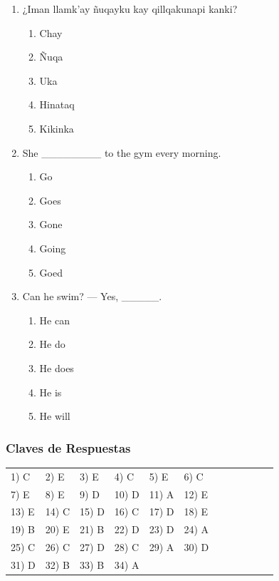\begin{enumerate}
	\item ¿Iman llamk’ay ñuqayku kay qillqakunapi kanki?
	\begin{enumerate}[label=\alph*)]
		\item Chay
		\item Ñuqa
		\item Uka
		\item Hinataq
		\item Kikinka
	\end{enumerate}
	

	
	\item She \_\_\_\_\_\_\_\_ to the gym every morning.
	\begin{enumerate}[label=\alph*)]
		\item Go
		\item Goes
		\item Gone
		\item Going
		\item Goed
	\end{enumerate}
	
	\item Can he swim? --- Yes, \_\_\_\_\_.
	\begin{enumerate}[label=\alph*)]
		\item He can
		\item He do
		\item He does
		\item He is
		\item He will
	\end{enumerate}
	
\end{enumerate}





\subsubsection*{Claves de Respuestas}

\begin{center}
	\begin{tabular}{ll ll ll ll ll ll}
		1) C & 2) E & 3) E & 4) C & 5) E & 6) C \\
		7) E & 8) E & 9) D & 10) D & 11) A & 12) E \\
		13) E & 14) C & 15) D & 16) C & 17) D & 18) E \\
		19) B & 20) E & 21) B & 22) D & 23) D & 24) A \\
		25) C & 26) C & 27) D & 28) C & 29) A & 30) D \\
		31) D & 32) B & 33) B & 34) A  & & \\
	\end{tabular}
\end{center}
